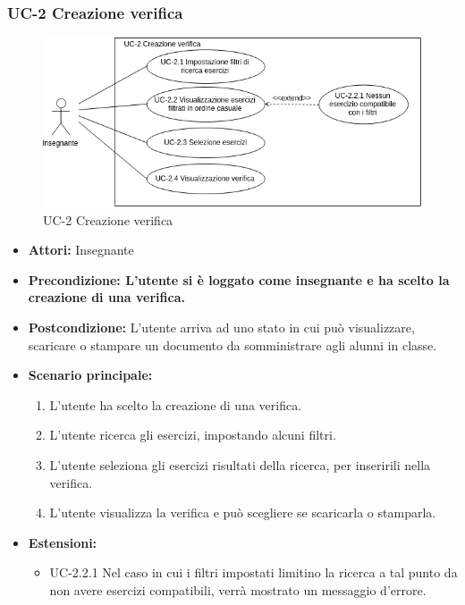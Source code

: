 \subsubsection{UC-2 Creazione verifica}
\begin{figure}[htbp]
	\centering
	\includegraphics[scale=0.7]{images/UC-2.png}
	\caption{UC-2 Creazione verifica}
\end{figure}
\begin{itemize}
		\item \textbf{Attori: } Insegnante
		
		\item \textbf{Precondizione: L'utente si è loggato come insegnante e ha scelto la creazione di una verifica. }
		\item \textbf{Postcondizione: }L'utente arriva ad uno stato in cui può visualizzare, scaricare o stampare un documento da somministrare agli alunni in classe.
		\item \textbf{Scenario principale: }
		\begin{enumerate}
		\item L'utente ha scelto la creazione di una verifica. 
		\item L'utente ricerca gli esercizi, impostando alcuni filtri.
		\item L'utente seleziona gli esercizi risultati della ricerca, per inseririli nella verifica.
		\item L'utente visualizza la verifica e può scegliere se scaricarla o stamparla.
		\end{enumerate}
		\item \textbf{Estensioni: }
		\begin{itemize}
		\item UC-2.2.1 Nel caso in cui i filtri impostati limitino la ricerca a tal punto da non avere esercizi compatibili, verrà mostrato un messaggio d'errore. 
		\end{itemize} 

		
		
\end{itemize}
\newpage
